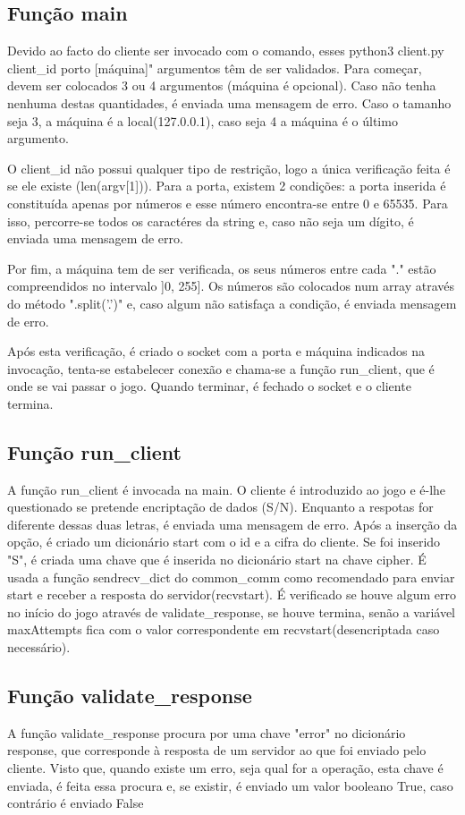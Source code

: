 \documentclass{report}
\begin{document}
\subsection{Função main}

Devido ao facto do cliente ser invocado com o comando, esses python3 client.py client\_id porto [máquina]"
argumentos têm de ser validados. Para começar, devem ser colocados 3 ou 4 argumentos (máquina é opcional).
Caso não tenha nenhuma destas quantidades, é enviada uma mensagem de erro. Caso o tamanho seja 3, a máquina é
a local(127.0.0.1), caso seja 4 a máquina é o último argumento. 

O client\_id não possui qualquer tipo de restrição, 
logo a única verificação feita é se ele existe (len(argv[1])). Para a porta, existem 2 condições: a porta inserida é 
constituída apenas por números e esse número encontra-se entre 0 e 65535. Para isso, percorre-se todos os caractéres 
da string e, caso não seja um dígito, é enviada uma mensagem de erro.

Por fim, a máquina tem de ser verificada,
os seus números entre cada "." estão compreendidos no intervalo ]0, 255]. Os números são colocados num array através
do método ".split('.')" e, caso algum não satisfaça a condição, é enviada mensagem de erro.

Após esta verificação, é criado o socket com a porta e máquina indicados na invocação, tenta-se estabelecer conexão e chama-se a 
função run\_client, que é onde se vai passar o jogo. Quando terminar, é fechado o socket e o cliente termina.

\subsection{Função run\_client}
A função run\_client é invocada na main. O cliente é introduzido ao jogo e é-lhe questionado se pretende encriptação
de dados (S/N). Enquanto a respotas for diferente dessas duas letras, é enviada uma mensagem de erro. Após a inserção da
opção, é criado um dicionário start com o id e a cifra do cliente. Se foi inserido "S", é criada uma chave que é inserida
no dicionário start na chave cipher. É usada a função sendrecv\_dict do common\_comm como recomendado para enviar start
e receber a resposta do servidor(recvstart). É verificado se houve algum erro no início do jogo através de validate\_response,
se houve termina, senão a variável maxAttempts fica com o valor correspondente em recvstart(desencriptada caso necessário).
\subsection{Função validate\_response}
A função validate\_response procura por uma chave "error" no dicionário response, que corresponde à resposta de um servidor
ao que foi enviado pelo cliente. Visto que, quando existe um erro, seja qual for a operação, esta chave é enviada, é feita essa
procura e, se existir, é enviado um valor booleano True, caso contrário é enviado False
\end{document}
